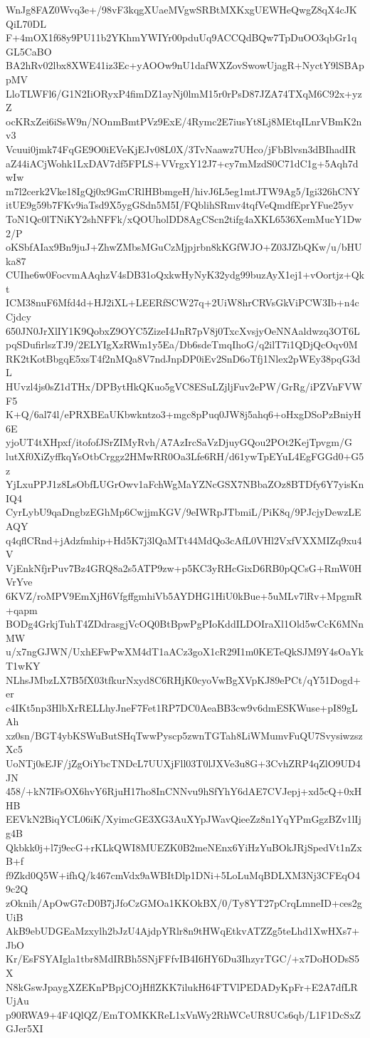 WnJg8FAZ0Wvq3e+/98vF3kqgXUaeMVgwSRBtMXKxgUEWHeQwgZ8qX4cJKQiL70DL
F+4mOX1f68y9PU11b2YKhmYWIYr00pduUq9ACCQdBQw7TpDuOO3qbGr1qGL5CaBO
BA2hRv02lbx8XWE41iz3Ec+yAOOw9nU1dafWXZovSwowUjagR+NyctY9lSBAppMV
LloTLWFl6/G1N2IiORyxP4fimDZ1ayNj0lmM15r0rPsD87JZA74TXqM6C92x+yzZ
ocKRxZei6iSsW9n/NOnmBmtPVz9ExE/4Rymc2E7iusYt8Lj8MEtqILnrVBmK2nv3
Vcuui0jmk74FqGE9O0iEVeKjEJv08L0X/3TvNaawz7UHco/jFbBlvsn3dBIhadIR
aZ44iACjWohk1LxDAV7df5FPLS+VVrgxY12J7+cy7mMzdS0C71dC1g+5Aqh7dwIw
m7l2cerk2Vke18IgQj0x9GmCRlHBbmgeH/hivJ6L5eg1mtJTW9Ag5/Igi326hCNY
itUE9g59b7FKv9iaTsd9X5ygGSdn5M5I/FQblihSRmv4tqfVeQmdfEprYFue25yv
ToN1Qc0lTNiKY2shNFFk/xQOUholDD8AgCScn2tifg4aXKL6536XemMucY1Dw2/P
oKSbfAIax9Bn9juJ+ZhwZMbsMGuCzMjpjrbn8kKGfWJO+Z03JZbQKw/u/bHUka87
CUIhe6w0FocvmAAqhzV4sDB31oQxkwHyNyK32ydg99buzAyX1ej1+vOortjz+Qkt
ICM38nuF6Mfd4d+HJ2iXL+LEERfSCW27q+2UiW8hrCRVsGkViPCW3Ib+n4cCjdcy
650JN0JrXlIY1K9QobxZ9OYC5ZizeI4JnR7pV8j0TxcXvsjyOeNNAaldwzq3OT6L
pqSDufirlszTJ9/2ELYIgXzRWm1y5Ea/Db6sdeTmqIhoG/q2ilT7i1QDjQcOqv0M
RK2tKotBbgqE5xsT4f2nMQa8V7ndJnpDP0iEv2SnD6oTfj1Nlex2pWEy38pqG3dL
HUvzl4js0sZ1dTHx/DPBytHkQKuo5gVC8ESuLZjljFuv2ePW/GrRg/iPZVnFVWF5
K+Q/6al74l/ePRXBEaUKbwkntzo3+mgc8pPuq0JW8j5ahq6+oHxgDSoPzBniyH6E
yjoUT4tXHpxf/itofofJSrZIMyRvh/A7AzIrcSaVzDjuyGQou2POt2KejTpvgm/G
lutXf0XiZyffkqYsOtbCrggz2HMwRR0Oa3Lfe6RH/d61ywTpEYuL4EgFGGd0+G5z
YjLxuPPJ1z8LsObfLUGrOwv1aFchWgMaYZNcGSX7NBbaZOz8BTDfy6Y7yisKnIQ4
CyrLybU9qaDngbzEGhMp6CwjjmKGV/9eIWRpJTbmiL/PiK8q/9PJcjyDewzLEAQY
q4qflCRnd+jAdzfmhip+Hd5K7j3lQaMTt44MdQo3cAfL0VHl2VxfVXXMIZq9xu4V
VjEnkNfjrPuv7Bz4GRQ8a2s5ATP9zw+p5KC3yRHcGixD6RB0pQCsG+RmW0HVrYve
6KVZ/roMPV9EmXjH6VfgffgmhiVb5AYDHG1HiU0kBue+5uMLv7lRv+MpgmR+qapm
BODg4GrkjTuhT4ZDdrasgjVcOQ0BtBpwPgPIoKddILDOIraXl1Old5wCcK6MNnMW
u/x7ngGJWN/UxhEFwPwXM4dT1aACz3goX1cR29I1m0KETeQkSJM9Y4sOaYkT1wKY
NLhsJMbzLX7B5fX03tfkurNxyd8C6RHjK0cyoVwBgXVpKJ89ePCt/qY51Dogd+er
c4IKt5np3HlbXrRELLhyJneF7Fet1RP7DC0AeaBB3cw9v6dmESKWuse+pI89gLAh
xz0sn/BGT4ybKSWuButSHqTwwPyscp5zwnTGTah8LiWMumvFuQU7SvysiwzszXc5
UoNTj0sEJF/jZgOiYbcTNDcL7UUXjFll03T0lJXVe3u8G+3CvhZRP4qZlO9UD4JN
458/+kN7IFsOX6hvY6RjuH17ho8InCNNvu9hSfYhY6dAE7CVJepj+xd5cQ+0xHHB
EEVkN2BiqYCL06iK/XyimcGE3XG3AuXYpJWavQieeZz8n1YqYPmGgzBZv1lIjg4B
Qkbkk0j+l7j9ecG+rKLkQWI8MUEZK0B2meNEnx6YiHzYuBOkJRjSpedVt1nZxB+f
f9Zkd0Q5W+ifhQ/k467cmVdx9aWBItDlp1DNi+5LoLuMqBDLXM3Nj3CFEqO49c2Q
zOknih/ApOwG7cD0B7jJfoCzGMOa1KKOkBX/0/Ty8YT27pCrqLmneID+ces2gUiB
AkB9ebUDGEaMzxylh2bJzU4AjdpYRlr8n9tHWqEtkvATZZg5teLhd1XwHXs7+JbO
Kr/EsFSYAIgla1tbr8MdIRBh5SNjFFfvIB4I6HY6Du3IhzyrTGC/+x7DoHODsS5X
N8kGswJpaygXZEKnPBpjCOjHflZKK7ilukH64FTVlPEDADyKpFr+E2A7dfLRUjAu
p90RWA9+4F4QlQZ/EmTOMKKReL1xVnWy2RhWCeUR8UCs6qb/L1F1DcSxZGJer5XI
